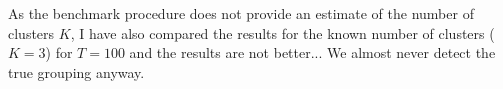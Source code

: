 \documentclass[12pt]{article}
\begin{document}
{As the benchmark procedure does not provide an estimate of the number of clusters $K$, I have also compared the results for the known number of clusters ($K=3$) for $T=100$ and the results are not better... We almost never detect the true grouping anyway.

%
%
  
}
\end{document}
